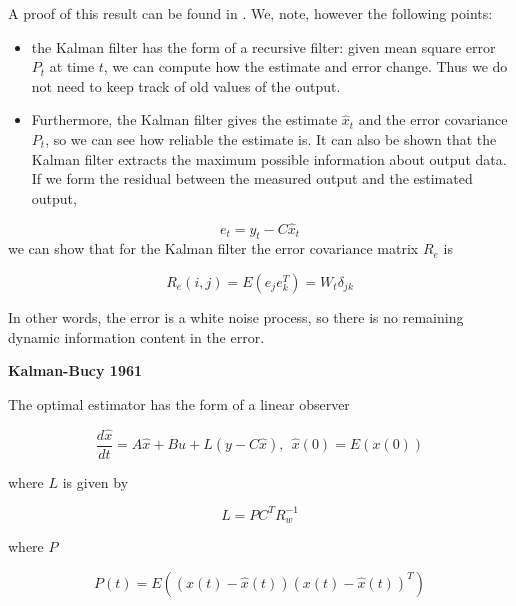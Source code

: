 A proof of this result can be found in \cite{Astrom}. We, note, however the following points:

\begin{itemize}
\item the Kalman filter has the form of a recursive filter: given mean square error $P_t$ at time $t$, we can compute how the estimate and error change. Thus we do not need to keep track of old values of the output.
\item Furthermore, the Kalman filter gives the estimate $\hat{x}_t$ and the error covariance $P_t$, so we can see how reliable the estimate is. 
It can also be shown that the Kalman filter extracts the maximum possible information about output data. 
If we form the residual between the measured output and the estimated output,
\end{itemize}

\begin{equation}
e_t = y_t - C\hat{x}_t
\end{equation}
we can show that for the Kalman filter the error covariance matrix $R_e$ is

\begin{equation}
R_e(i,j) = E(e_{j}e_{k}^{T}) = W_t\delta_{jk} 
\end{equation}

In other words, the error is a white noise process, so there is no remaining dynamic information content in the error.




\begin{framed}
\theoremstyle{theorem}
\begin{theorem}{\textbf{Kalman-Bucy 1961}}


The optimal estimator has the form of a linear observer 

\begin{equation}
\frac{d\hat{x}}{dt} = A\hat{x} + Bu + L(y - C\hat{x}),  ~~ \hat{x}(0) = E(x(0)) \nonumber
\end{equation} 

where $L$ is given by

\begin{equation}
L = PC^TR_{w}^{-1}  \nonumber
\end{equation}

where $P$

\begin{equation}
P(t) = E((x(t)-\hat{x}(t))(x(t)-\hat{x}(t))^T)  \nonumber
\end{equation}

\end{theorem}
\end{framed}



